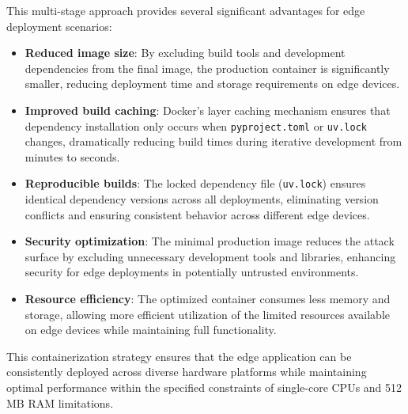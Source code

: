 This multi-stage approach provides several significant advantages for edge deployment scenarios:

\begin{itemize}
    \item \textbf{Reduced image size}: By excluding build tools and development dependencies from the final image, the production container is significantly smaller, reducing deployment time and storage requirements on edge devices.
    
    \item \textbf{Improved build caching}: Docker's layer caching mechanism ensures that dependency installation only occurs when \texttt{pyproject.toml} or \texttt{uv.lock} changes, dramatically reducing build times during iterative development from minutes to seconds.
    
    \item \textbf{Reproducible builds}: The locked dependency file (\texttt{uv.lock}) ensures identical dependency versions across all deployments, eliminating version conflicts and ensuring consistent behavior across different edge devices.
    
    \item \textbf{Security optimization}: The minimal production image reduces the attack surface by excluding unnecessary development tools and libraries, enhancing security for edge deployments in potentially untrusted environments.
    
    \item \textbf{Resource efficiency}: The optimized container consumes less memory and storage, allowing more efficient utilization of the limited resources available on edge devices while maintaining full functionality.
\end{itemize}

This containerization strategy ensures that the edge application can be consistently deployed across diverse hardware platforms while maintaining optimal performance within the specified constraints of single-core CPUs and 512 MB RAM limitations.


